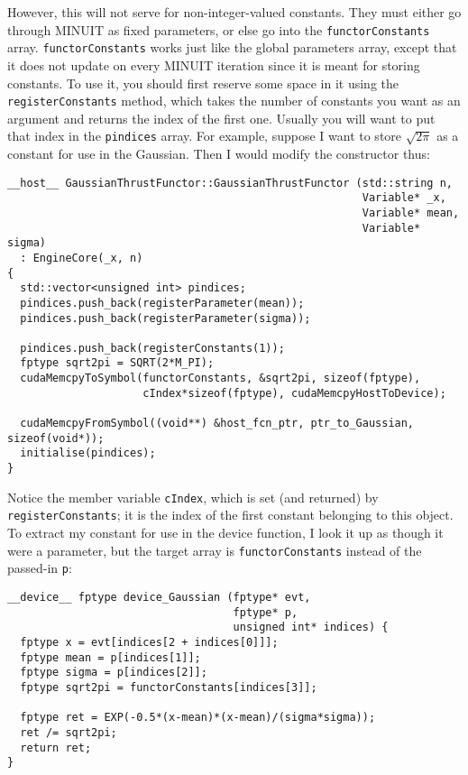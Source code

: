 \documentclass[12pt,pdflatex]{article}
\begin{document}
However, this will not serve for non-integer-valued constants. They must either
go through MINUIT as fixed parameters, or else go into the \texttt{functorConstants}
array. \verb|functorConstants| works just like the global parameters
array, except that it does not update on every MINUIT iteration since
it is meant for storing constants. To use it, you should first reserve
some space in it using the \verb|registerConstants| method, which takes
the number of constants you want as an argument and returns the index
of the first one. Usually you will want to put that index in the \verb|pindices|
array. For example, suppose I want to store $\sqrt{2\pi}$ as a constant
for use in the Gaussian. Then I would modify the constructor thus:
\begin{verbatim}
__host__ GaussianThrustFunctor::GaussianThrustFunctor (std::string n, 
                                                       Variable* _x, 
                                                       Variable* mean, 
                                                       Variable* sigma) 
  : EngineCore(_x, n) 
{
  std::vector<unsigned int> pindices;
  pindices.push_back(registerParameter(mean));
  pindices.push_back(registerParameter(sigma));

  pindices.push_back(registerConstants(1)); 
  fptype sqrt2pi = SQRT(2*M_PI);
  cudaMemcpyToSymbol(functorConstants, &sqrt2pi, sizeof(fptype), 
                     cIndex*sizeof(fptype), cudaMemcpyHostToDevice); 

  cudaMemcpyFromSymbol((void**) &host_fcn_ptr, ptr_to_Gaussian, sizeof(void*));
  initialise(pindices); 
}
\end{verbatim}
Notice the member variable \verb|cIndex|, which is set (and returned) by \verb|registerConstants|; it is the
index of the first constant belonging to this object. To extract my constant for
use in the device function, I look it up as though it were a parameter, but the
target array is \verb|functorConstants| instead of the passed-in \verb|p|:
\begin{verbatim}
__device__ fptype device_Gaussian (fptype* evt, 
                                   fptype* p, 
                                   unsigned int* indices) {
  fptype x = evt[indices[2 + indices[0]]]; 
  fptype mean = p[indices[1]];
  fptype sigma = p[indices[2]];
  fptype sqrt2pi = functorConstants[indices[3]];

  fptype ret = EXP(-0.5*(x-mean)*(x-mean)/(sigma*sigma));
  ret /= sqrt2pi; 
  return ret; 
}
\end{verbatim}
\end{document}
